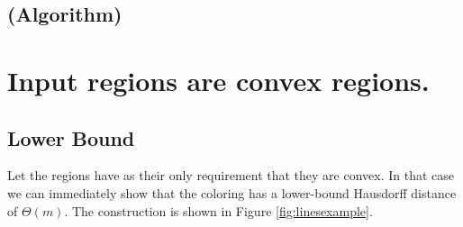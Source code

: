 \documentclass[a4paper,UKenglish,cleveref]{lipics-v2019}
\begin{document}

\subsection{(Algorithm)}
\label{sub:fat_algo}






\section{Input regions are convex regions.}\label{sec:convex}
\subsection{Lower Bound}\label{sub:convex_lower}

Let the regions have as their only requirement that they are convex. In that case we can immediately show that the coloring has a lower-bound Hausdorff distance of $\Theta(m)$. The construction is shown in Figure \ref{fig:linesexample}.
\end{document}
